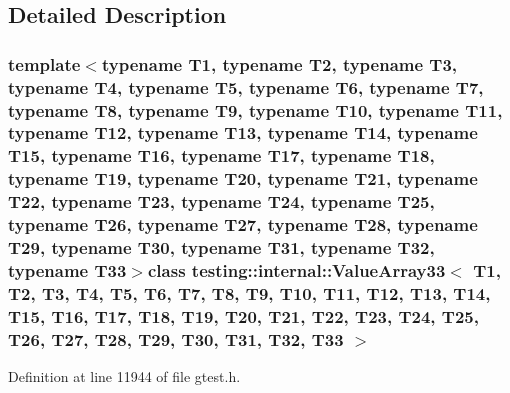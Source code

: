 \subsection{\-Detailed \-Description}
\subsubsection*{template$<$typename T1, typename T2, typename T3, typename T4, typename T5, typename T6, typename T7, typename T8, typename T9, typename T10, typename T11, typename T12, typename T13, typename T14, typename T15, typename T16, typename T17, typename T18, typename T19, typename T20, typename T21, typename T22, typename T23, typename T24, typename T25, typename T26, typename T27, typename T28, typename T29, typename T30, typename T31, typename T32, typename T33$>$class testing\-::internal\-::\-Value\-Array33$<$ T1, T2, T3, T4, T5, T6, T7, T8, T9, T10, T11, T12, T13, T14, T15, T16, T17, T18, T19, T20, T21, T22, T23, T24, T25, T26, T27, T28, T29, T30, T31, T32, T33 $>$}



\-Definition at line 11944 of file gtest.\-h.



